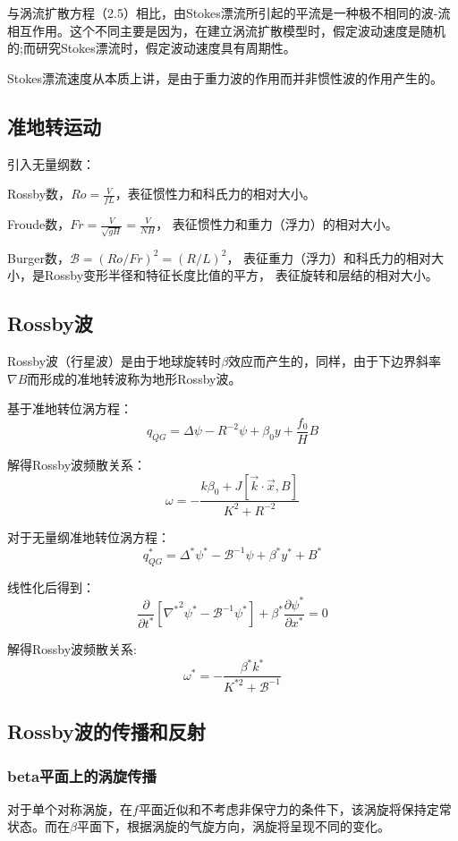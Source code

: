 \documentclass{article}
\begin{document}
与涡流扩散方程（2.5）相比，由Stokes漂流所引起的平流是一种极不相同的波-流相互作用。这个不同主要是因为，在建立涡流扩散模型时，假定波动速度是随机的;而研究Stokes漂流时，假定波动速度具有周期性。

Stokes漂流速度从本质上讲，是由于重力波的作用而并非惯性波的作用产生的。

\subsection{准地转运动}
引入无量纲数：

Rossby数，$Ro=\frac{V}{fL}$，表征惯性力和科氏力的相对大小。

Froude数，$Fr = \frac{V}{\sqrt{gH}} = \frac{V}{NH}$，
表征惯性力和重力（浮力）的相对大小。

Burger数，$\mathcal{B} = (Ro/Fr)^2 = (R/L)^2$，
表征重力（浮力）和科氏力的相对大小，是Rossby变形半径和特征长度比值的平方，
表征旋转和层结的相对大小。

\subsection{Rossby波}
Rossby波（行星波）是由于地球旋转时$\beta$效应而产生的，同样，由于下边界斜率$\nabla B$而形成的准地转波称为地形Rossby波。

基于准地转位涡方程：
$$q_{QG} = \Delta \psi-R^{-2}\psi+\beta_0y+\frac{f_0}{H}B$$

解得Rossby波频散关系：
$$\omega = -\frac{k\beta_0+J[\vec{k}\cdot\vec{x}, B]}{K^2+R^{-2}}$$

对于无量纲准地转位涡方程：
$$q_{QG}^* = \Delta^*\psi^*-\mathcal{B}^{-1}\psi+\beta^*y^*+B^*$$

线性化后得到：
$$\frac{\partial }{\partial {{t}^{*}}}\left[ {{\nabla }^{*}}^{2}{{\psi }^{*}}-{{\mathcal{B}}^{-1}}{{\psi }^{*}} \right]+{{\beta }^{*}}\frac{\partial {{\psi }^{*}}}{\partial {{x}^{*}}}=0$$

解得Rossby波频散关系:
$$\omega^*=-\frac{\beta^*k^*}{K^{*2}+\mathcal{B}^{-1}}$$

\subsection{Rossby波的传播和反射}

\subsubsection{beta平面上的涡旋传播}
对于单个对称涡旋，在$f$平面近似和不考虑非保守力的条件下，该涡旋将保持定常状态。而在$\beta$平面下，根据涡旋的气旋方向，涡旋将呈现不同的变化。
\end{document}
